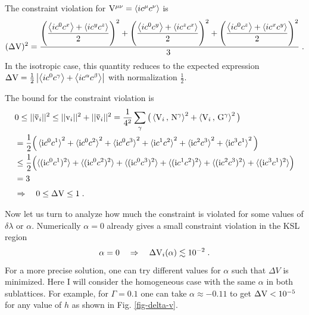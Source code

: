 The constraint violation for %
$\mathrm{V}^{\mu\nu}=\left<ic^\mu c^{\nu}\right>$ is
\begin{equation}
 (\Delta \rmV)^2 %
 =\dfrac{
 \left(\dfrac{\left<ic^0c^{{x}}\right>+\left<ic^{{y}}c^{{z}}\right>}{2}\right)^2+
 \left(\dfrac{\left<ic^0c^{{y}}\right>+\left<ic^{{z}}c^{{x}}\right>}{2}\right)^2+
 \left(\dfrac{\left<ic^0c^{{z}}\right>+\left<ic^{{x}}c^{{y}}\right>}{2}\right)^2
 }{3\; }\;.
\end{equation}
In the isotropic case, this quantity reduces to the expected expression $\Delta \mathrm{V} = \frac{1}{2}\left|\left<ic^0c^{{\gamma}}\right>+\left<ic^{{\alpha}}c^{{\beta}}\right>\right|$ with normalization $ \frac{1}{2}$.


The bound for the constraint violation is
\begin{align*}
    &0\leq || \bar{\mathrm{v}}_i||^2
\leq
 || {\mathrm{v}}_i||^2 + || \bar{\mathrm{v}}_i||^2
=
\frac{1}{4^2}\sum_\gamma  \big(
\braket{\rmV_i\,,\,\rmN^\gamma }^2 +\braket{\rmV_i\,,\,\rmG^\gamma }^2 \big)
\\& =
\frac{1}{2} \Big(
\braket{\im c^0 c^1 }^2+
\braket{\im c^0 c^2 }^2+
\braket{\im c^0 c^3 }^2+
\braket{\im c^1 c^2 }^2+
\braket{\im c^2 c^3 }^2+
\braket{\im c^3 c^1 }^2
\Big)
\\& \leq
\frac{1}{2} \Big( \!
\braket{(\im c^0 c^1)^2 }+
\braket{(\im c^0 c^2)^2 }+
\braket{(\im c^0 c^3)^2 }+
\braket{(\im c^1 c^2)^2 }+
\braket{(\im c^2 c^3)^2 }+
\braket{(\im c^3 c^1)^2 }\!
\Big)
\\&
= 3 \;   \\[3pt]
& \Rightarrow \quad 0 \leq \Delta \rmV \leq 1 \; .
\end{align*}

Now let us turn to analyze how much the constraint is violated for some values of $\delta \lambda$ or $\alpha$.
Numerically $\alpha=0$ already gives a small constraint violation in the KSL region
\begin{equation}
    \alpha = 0 \quad \Rightarrow \quad  \Delta \mathrm{V}_i(\alpha)  \lesssim 10^{-2} \; .
\end{equation}
For a more precise solution, one can try different values for $\alpha$ such that $\Delta V$ is minimized.
Here I will consider the homogeneous case with the same $\alpha$ in both sublattices.
For example, for  $\Gamma=0.1$  one can take  $ \alpha \approx -0.11$ to get $ \Delta \mathrm{V} < 10^{-5}$ for any value of $h$ as shown in Fig. \ref{fig-delta-v}.

